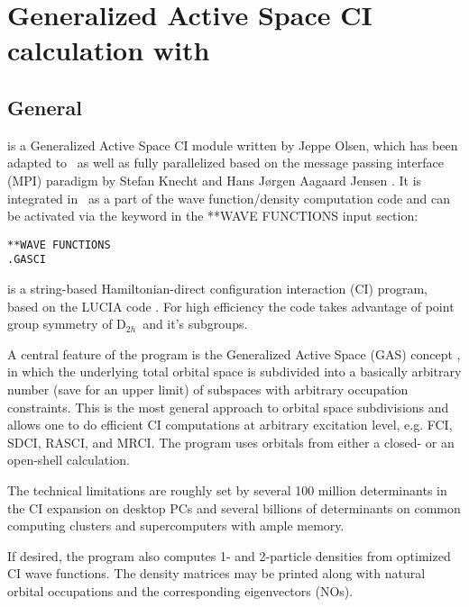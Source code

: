 \chapter{Generalized Active Space CI calculation with {\lucita}}\label{ch:lucita}

\section{General}\label{sec:lucita-general}

{\lucita} is a Generalized Active Space CI module written by Jeppe Olsen, 
which has been adapted to \dalton\ as well as fully parallelized 
based on the message passing interface (MPI) paradigm 
by Stefan Knecht and Hans J{\o}rgen Aagaard Jensen \cite{knecht08}.
It is integrated in \dalton\ as a part of the wave function/density computation code 
and can be activated via the keyword {} in the **WAVE FUNCTIONS 
input section:\\[2ex]
\begin{inputex} \begin{verbatim}
**WAVE FUNCTIONS
.GASCI
\end{verbatim} \end{inputex}
\vspace{2ex}

{\lucita} is a string-based Hamiltonian-direct configuration interaction (CI) program, based on the LUCIA code \cite{olsen90}. 
For high efficiency the code takes advantage of point group symmetry of D$_{2h}$\ and it's subgroups.

A central feature of the program is the Generalized Active Space (GAS) concept \cite{fleig_gasci2}, 
in which the underlying total orbital space is subdivided 
into a basically arbitrary number (save for an upper limit) 
of subspaces with arbitrary occupation constraints. 
This is the most general approach to orbital space subdivisions and allows one to do 
efficient CI computations at arbitrary excitation level, e.g. FCI, SDCI, RASCI, 
and MRCI. The program uses orbitals from either a closed- or an open-shell calculation.

The technical limitations are roughly set by several 100 million determinants 
in the CI expansion on desktop PCs and several billions of determinants 
on common computing clusters and supercomputers with ample memory.

If desired, the program also computes 1- and 2-particle densities from optimized CI wave functions. 
The density matrices may be printed along with natural orbital occupations 
and the corresponding eigenvectors (NOs).

